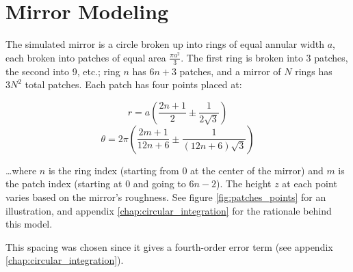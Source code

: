 \documentclass[etd,senior,noacknowledgments]{BYUPhys}
\begin{document}






\section{Mirror Modeling} \label{section:mirror_modeling}

The simulated mirror is a circle broken up into rings of equal annular width $a$, each broken into patches of equal area $\frac{\pi a^2}{3}$. The first ring is broken into 3 patches, the second into 9, etc.; ring $n$ has $6n+3$ patches, and a mirror of $N$ rings has $3N^2$ total patches. Each patch has four points placed at:

\begin{equation} \label{eq:point_r}
  r = a \left(\frac{2n+1}{2} \pm \frac{1}{2\sqrt{3}}\right)
\end{equation}
\begin{equation} \label{eq:point_th}
  \theta = 2\pi \left(\frac{2m+1}{12n+6} \pm \frac{1}{\left(12n+6\right)\sqrt{3}}\right)
\end{equation}

\ldots where $n$ is the ring index (starting from 0 at the center of the mirror) and $m$ is the patch index (starting at 0 and going to $6n-2$). The height $z$ at each point varies based on the mirror's roughness. See figure \ref{fig:patches_points} for an illustration, and appendix \ref{chap:circular_integration} for the rationale behind this model.

This spacing was chosen since it gives a fourth-order error term (see appendix \ref{chap:circular_integration}).
\end{document}
